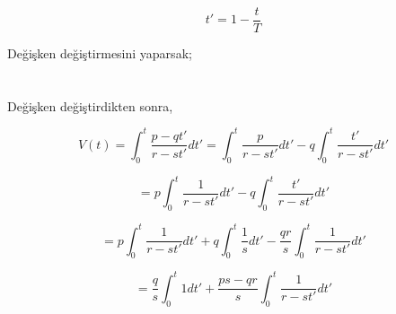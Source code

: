 \documentclass[a4paper,10pt]{article}
\begin{document}
 \[
  t' = 1 - \frac{t}{T}
 \]
 
    Değişken değiştirmesini yaparsak;
    
\section{}

Değişken değiştirdikten sonra,

\[
 V(t) = \int_0^t\frac{p-qt'}{r-st'} dt' = \int_0^t\frac{p}{r-st'} dt' - q \int_0^t\frac{t'}{r-st'} dt'
\]

\[ 
 = p\int_0^t\frac{1}{r-st'} dt' - q \int_0^t\frac{t'}{r-st'}dt'
\]

\[ 
 = p\int_0^t\frac{1}{r-st'} dt' +q \int_0^t\frac{1}{s} dt' -\frac{qr}{s}\int_0^t\frac{1}{r-st'} dt'
\]

\[
 = \frac{q}{s}\int_0^t{1}dt' + \frac{ps-qr}{s}\int_0^t\frac{1}{r-st'} dt'
\]
\end{document}
